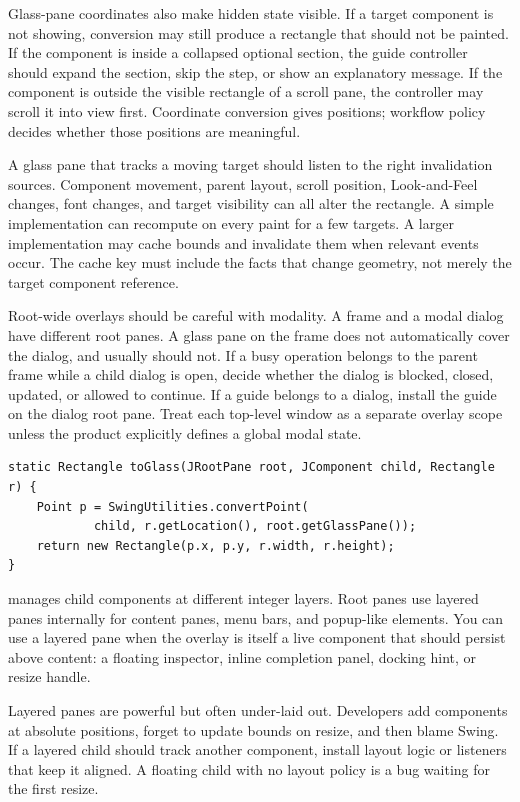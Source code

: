 Glass-pane coordinates also make hidden state visible. If a target component is
not showing, conversion may still produce a rectangle that should not be
painted. If the component is inside a collapsed optional section, the guide
controller should expand the section, skip the step, or show an explanatory
message. If the component is outside the visible rectangle of a scroll pane, the
controller may scroll it into view first. Coordinate conversion gives positions;
workflow policy decides whether those positions are meaningful.

A glass pane that tracks a moving target should listen to the right invalidation
sources. Component movement, parent layout, scroll position, Look-and-Feel
changes, font changes, and target visibility can all alter the rectangle. A
simple implementation can recompute on every paint for a few targets. A larger
implementation may cache bounds and invalidate them when relevant events occur.
The cache key must include the facts that change geometry, not merely the target
component reference.

Root-wide overlays should be careful with modality. A frame and a modal dialog
have different root panes. A glass pane on the frame does not automatically
cover the dialog, and usually should not. If a busy operation belongs to the
parent frame while a child dialog is open, decide whether the dialog is blocked,
closed, updated, or allowed to continue. If a guide belongs to a dialog, install
the guide on the dialog root pane. Treat each top-level window as a separate
overlay scope unless the product explicitly defines a global modal state.

\begin{lstlisting}[caption={Converting a child rectangle to glass-pane coordinates.}]
static Rectangle toGlass(JRootPane root, JComponent child, Rectangle r) {
    Point p = SwingUtilities.convertPoint(
            child, r.getLocation(), root.getGlassPane());
    return new Rectangle(p.x, p.y, r.width, r.height);
}
\end{lstlisting}

 manages child components at different integer layers. Root panes use layered panes internally for content panes, menu bars, and popup-like elements. You can use a layered pane when the overlay is itself a live component that should persist above content: a floating inspector, inline completion panel, docking hint, or resize handle.

Layered panes are powerful but often under-laid out. Developers add components at absolute positions, forget to update bounds on resize, and then blame Swing. If a layered child should track another component, install layout logic or listeners that keep it aligned. A floating child with no layout policy is a bug waiting for the first resize.

